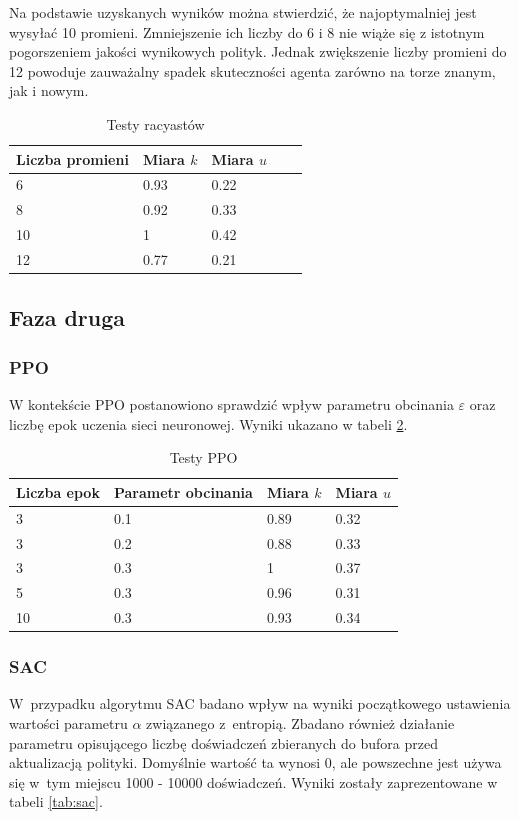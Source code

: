 \documentclass[a4paper,12pt]{article}
\begin{document}
Na podstawie uzyskanych wyników można stwierdzić, że najoptymalniej jest wysyłać 10 promieni. Zmniejszenie ich liczby do 6 i 8 nie wiąże się z istotnym pogorszeniem jakości wynikowych polityk. Jednak zwiększenie liczby promieni do 12 powoduje zauważalny spadek skuteczności agenta zarówno na torze znanym, jak i nowym.

\begin{table}[H]
	\centering
	\smallskip
	\begin{tabular}{|l|l|l|l|l|}
		\hline
		Liczba promieni & Miara $k$ & Miara $u$ \\
		\hline
		6 & 0.93 & 0.22 \\		
		8 & 0.92 & 0.33 \\		
		10 & 1 & 0.42 \\		
		12 & 0.77 & 0.21 \\\hline
	\end{tabular}
	\caption{Testy racyastów}
	\label{tab:raycast}
\end{table}


\subsection{Faza druga}
\subsubsection{PPO}
W kontekście PPO postanowiono sprawdzić wpływ parametru obcinania $\varepsilon$ oraz liczbę epok uczenia sieci neuronowej. Wyniki ukazano w tabeli \ref{tab:ppo}.

\begin{table}[H]
	\centering
	\smallskip
	\begin{tabular}{|l|l|l|l|}
		\hline
		Liczba epok & Parametr obcinania & Miara $k$ & Miara $u$ \\
		\hline
		3 & 0.1 & 0.89 & 0.32 \\		
		3 & 0.2 & 0.88 & 0.33 \\		
		3 & 0.3 & 1 & 0.37 \\		
		5 & 0.3 & 0.96 & 0.31 \\
		10 & 0.3 & 0.93 & 0.34 \\\hline
	\end{tabular}
	\caption{Testy PPO}
	\label{tab:ppo}
\end{table}

\subsubsection{SAC}
W~przypadku algorytmu SAC badano wpływ na wyniki początkowego ustawienia wartości parametru $\alpha$ związanego z~entropią. Zbadano również działanie parametru opisującego liczbę doświadczeń zbieranych do bufora przed aktualizacją polityki. Domyślnie wartość ta wynosi 0, ale powszechne jest używa się w~tym miejscu 1000 - 10000 doświadczeń. Wyniki zostały zaprezentowane w tabeli \ref{tab:sac}.
\end{document}

